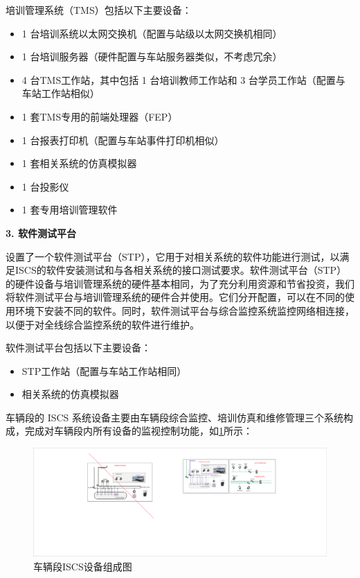培训管理系统（TMS）包括以下主要设备：
\begin{itemize}
	\item 1 台培训系统以太网交换机（配置与站级以太网交换机相同）
	\item 1 台培训服务器（硬件配置与车站服务器类似，不考虑冗余）
	\item 4 台TMS工作站，其中包括 1 台培训教师工作站和 3 台学员工作站（配置与车站工作站相似）
	\item 1 套TMS专用的前端处理器（FEP）
	\item 1 台报表打印机（配置与车站事件打印机相似）
	\item 1 套相关系统的仿真模拟器
	\item 1 台投影仪
	\item 1 套专用培训管理软件
\end{itemize}

\textbf{3. 软件测试平台}

设置了一个软件测试平台（STP），它用于对相关系统的软件功能进行测试，以满足ISCS的软件安装测试和与各相关系统的接口测试要求。软件测试平台（STP）的硬件设备与培训管理系统的硬件基本相同，为了充分利用资源和节省投资，我们将软件测试平台与培训管理系统的硬件合并使用。它们分开配置，可以在不同的使用环境下安装不同的软件。同时，软件测试平台与综合监控系统监控网络相连接，以便于对全线综合监控系统的软件进行维护。

软件测试平台包括以下主要设备：
\begin{itemize}
	\item STP工作站（配置与车站工作站相同）
	\item 相关系统的仿真模拟器
\end{itemize}

车辆段的 ISCS 系统设备主要由车辆段综合监控、培训仿真和维修管理三个系统构成，完成对车辆段内所有设备的监视控制功能，如\ref{fig:车辆段ISCS设备组成图}所示：
\begin{figure}[h]
	\centering
	\includegraphics[width=0.8\linewidth]{figures/车辆段ISCS设备组成图}
	\caption{车辆段ISCS设备组成图}
	\label{fig:车辆段ISCS设备组成图}
\end{figure}


